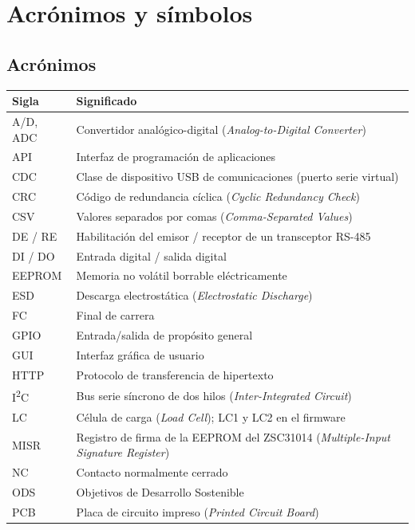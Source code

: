 \chapter*{Acrónimos y símbolos}
\thispagestyle{plain}

\section*{Acrónimos}
\begin{longtable}{@{}L{0.18\textwidth}L{0.76\textwidth}@{}}
\toprule
\textbf{Sigla} & \textbf{Significado} \\
\midrule
\endhead
A/D, ADC & Convertidor analógico-digital (\emph{Analog-to-Digital Converter}) \\
API      & Interfaz de programación de aplicaciones \\
CDC      & Clase de dispositivo USB de comunicaciones (puerto serie virtual) \\
CRC      & Código de redundancia cíclica (\emph{Cyclic Redundancy Check}) \\
CSV      & Valores separados por comas (\emph{Comma-Separated Values}) \\
DE / RE  & Habilitación del emisor / receptor de un transceptor RS-485 \\
DI / DO  & Entrada digital / salida digital \\
EEPROM   & Memoria no volátil borrable eléctricamente \\
ESD      & Descarga electrostática (\emph{Electrostatic Discharge}) \\
FC       & Final de carrera \\
GPIO     & Entrada/salida de propósito general \\
GUI      & Interfaz gráfica de usuario \\
HTTP     & Protocolo de transferencia de hipertexto \\
I\textsuperscript{2}C & Bus serie síncrono de dos hilos (\emph{Inter-Integrated Circuit}) \\
LC       & Célula de carga (\emph{Load Cell}); LC1 y LC2 en el firmware \\
MISR     & Registro de firma de la EEPROM del ZSC31014 (\emph{Multiple-Input Signature Register}) \\
NC       & Contacto normalmente cerrado \\
ODS      & Objetivos de Desarrollo Sostenible \\
PCB      & Placa de circuito impreso (\emph{Printed Circuit Board}) \\

\end{longtable}
